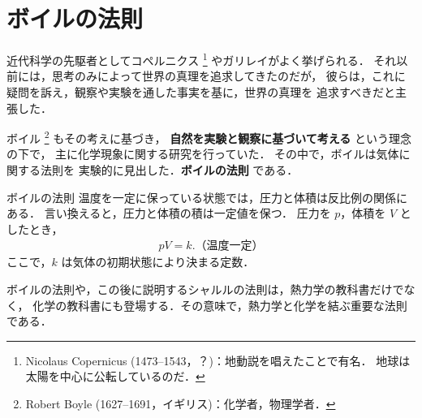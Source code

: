 ﻿%
        \section{ボイルの法則}
            近代科学の先駆者としてコペルニクス
                \footnote{
                    Nicolaus Copernicus (1473--1543，？)：地動説を唱えたことで有名．
                    地球は太陽を中心に公転しているのだ．
                }
            やガリレイがよく挙げられる．
            それ以前には，思考のみによって世界の真理を追求してきたのだが，
            彼らは，これに疑問を訴え，観察や実験を通した事実を基に，世界の真理を
            追求すべきだと主張した．

            ボイル
                \footnote{
                    Robert Boyle (1627--1691，イギリス)：化学者，物理学者．
                }
            もその考えに基づき， \textbf{自然を実験と観察に基づいて考える} という理念の下で，
            主に化学現象に関する研究を行っていた．
            その中で，ボイルは気体に関する法則を
            実験的に見出した．\textbf{ボイルの法則} である．
                \begin{myshadebox}{ボイルの法則}
                    温度を一定に保っている状態では，圧力と体積は反比例の関係にある．
                    言い換えると，圧力と体積の積は一定値を保つ．
                    圧力を $p$，体積を $V$ としたとき，
                    \begin{align}
                        pV = k. \mbox{（温度一定）}
                    \end{align}
                    ここで，$k$ は気体の初期状態により決まる定数．
                \end{myshadebox}

            ボイルの法則や，この後に説明するシャルルの法則は，熱力学の教科書だけでなく，
            化学の教科書にも登場する．その意味で，熱力学と化学を結ぶ重要な法則である．


